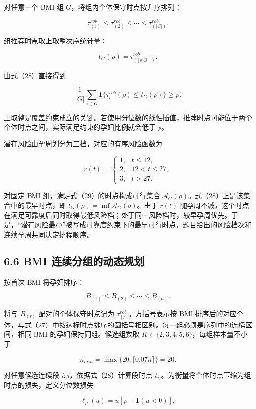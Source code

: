 \documentclass[UTF8,fontset=fandol,zihao=-4,a4paper]{ctexart}
\begin{document}
对任意一个 BMI 组 \(G\)，将组内个体保守时点按升序排列：

\[
\tau_{(1)}^{rob}
\le\tau_{(2)}^{rob}
\le\cdots
\le\tau_{(|G|)}^{rob}.
\tag{27}
\]

组推荐时点取上取整次序统计量：

\[
t_G(\rho)
=\tau_{(\lceil\rho|G|\rceil)}^{rob}.
\tag{28}
\]

由式（28）直接得到

\[
\frac{1}{|G|}
\sum_{i\in G}
\mathbf 1
\{\tau_i^{rob}(\rho)\le t_G(\rho)\}
\ge\rho.
\tag{29}
\]

上取整是覆盖约束成立的关键。若使用分位数的线性插值，推荐时点可能位于两个个体时点之间，实际满足约束的孕妇比例就会低于
\(\rho\)。

潜在风险由孕周划分为三档，对应的有序风险函数为

\[
r(t)=
\begin{cases}
1,&t\le 12,\\
2,&12<t\le 27,\\
3,&t>27.
\end{cases}
\tag{29a}
\]

对固定 BMI 组，满足式（29）的时点构成可行集合
\(\mathcal A_G(\rho)\)。式（28）正是该集合中的最早时点，即
\(t_G(\rho)=\inf\mathcal A_G(\rho)\)。由于 \(r(t)\)
随孕周不减，这个时点在满足可靠度后同时取得最低风险档；处于同一风险档时，较早孕周优先。于是，``潜在风险最小''被写成可靠度约束下的最早可行时点，题目给出的风险档次和连续孕周共同决定排程顺序。

\subsection{6.6 BMI
连续分组的动态规划}\label{bmi-ux8fdeux7eedux5206ux7ec4ux7684ux52a8ux6001ux89c4ux5212}

按首次 BMI 将孕妇排序：

\[
B_{(1)}\le B_{(2)}\le\cdots\le B_{(n)}.
\tag{30}
\]

将与 \(B_{(r)}\) 配对的个体保守时点记为
\(\tau_{[r]}^{rob}\)。方括号表示按 BMI
排序后的对应个体，与式（27）中按达标时点排序的圆括号相区别。每一组必须是序列中的连续区间，相同
BMI 的孕妇保持同组。候选组数取 \(K\in\{2,3,4,5,6\}\)，每组样本量不小于

\[
n_{min}=\max\{20,\lceil0.07n\rceil\}=20.
\tag{31}
\]

对任意候选连续段 \(i{:}j\)，依据式（28）计算段时点
\(t_{ij}\)。为衡量将个体时点压缩为组时点的损失，定义分位数损失

\[
\ell_{\rho}(u)
=u\left[\rho-\mathbf 1(u<0)\right],
\tag{32}
\]
\end{document}
